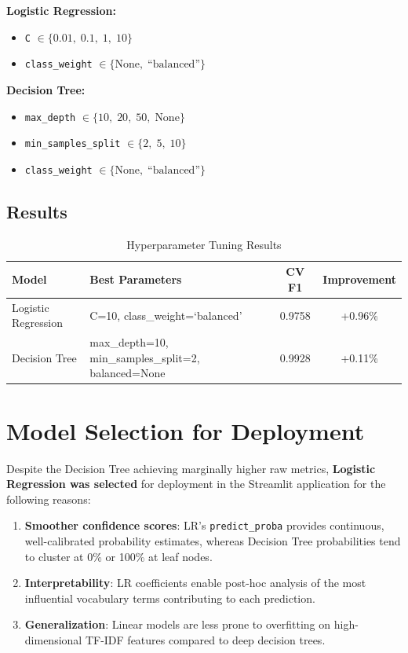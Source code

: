 \documentclass[12pt, a4paper]{article}
\begin{document}
\textbf{Logistic Regression:}
\begin{itemize}[nosep]
    \item \texttt{C} $\in \{0.01,\; 0.1,\; 1,\; 10\}$
    \item \texttt{class\_weight} $\in \{\text{None},\; \text{``balanced''}\}$
\end{itemize}

\textbf{Decision Tree:}
\begin{itemize}[nosep]
    \item \texttt{max\_depth} $\in \{10,\; 20,\; 50,\; \text{None}\}$
    \item \texttt{min\_samples\_split} $\in \{2,\; 5,\; 10\}$
    \item \texttt{class\_weight} $\in \{\text{None},\; \text{``balanced''}\}$
\end{itemize}

\subsection{Results}

\begin{table}[H]
\centering
\caption{Hyperparameter Tuning Results}
\begin{tabular}{@{}llcc@{}}
\toprule
\textbf{Model}    & \textbf{Best Parameters}                              & \textbf{CV F1} & \textbf{Improvement} \\
\midrule
Logistic Regression & C=10, class\_weight=`balanced'                       & 0.9758         & +0.96\%              \\
Decision Tree       & max\_depth=10, min\_samples\_split=2, balanced=None   & 0.9928         & +0.11\%              \\
\bottomrule
\end{tabular}
\end{table}

\section{Model Selection for Deployment}

Despite the Decision Tree achieving marginally higher raw metrics, \textbf{Logistic Regression was selected} for deployment in the Streamlit application for the following reasons:

\begin{enumerate}[nosep]
    \item \textbf{Smoother confidence scores}: LR's \texttt{predict\_proba} provides continuous, well-calibrated probability estimates, whereas Decision Tree probabilities tend to cluster at 0\% or 100\% at leaf nodes.
    \item \textbf{Interpretability}: LR coefficients enable post-hoc analysis of the most influential vocabulary terms contributing to each prediction.
    \item \textbf{Generalization}: Linear models are less prone to overfitting on high-dimensional TF-IDF features compared to deep decision trees.
\end{enumerate}
\end{document}
